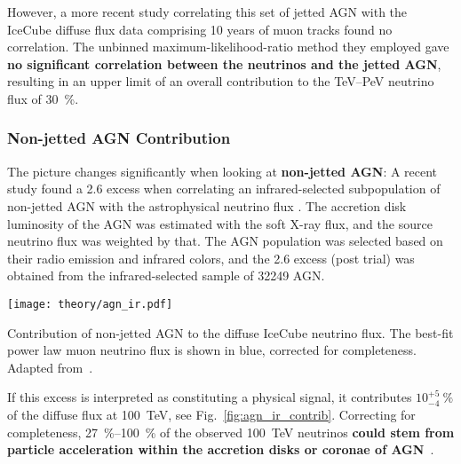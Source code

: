 However, a more recent study correlating this set of jetted AGN with the IceCube diffuse flux data comprising 10 years of muon tracks found no correlation. The unbinned maximum-likelihood-ratio method they employed gave \textbf{no significant correlation between the neutrinos and the jetted AGN}, resulting in an upper limit of an overall contribution to the \unit{\tera\eV}--\unit{\peta\eV} neutrino flux of \SI{30}{\percent}.

\subsubsection{Non-jetted AGN Contribution}

The picture changes significantly when looking at \textbf{non-jetted AGN}: A recent study found a \SI{2.6}{\sigma} excess when correlating an infrared-selected subpopulation of non-jetted AGN with the astrophysical neutrino flux . The accretion disk luminosity of the AGN was estimated with the soft X-ray flux, and the source neutrino flux was weighted by that. The AGN population was selected based on their radio emission and infrared colors, and the \SI{2.6}{\sigma} excess (post trial) was obtained from the infrared-selected sample of 32249 AGN\@.

\begin{marginfigure}
    \texttt{[image: theory/agn\_ir.pdf]}
    \caption[Non-jetted AGN]{Contribution of non-jetted AGN to the diffuse IceCube neutrino flux. The best-fit power law muon neutrino flux is shown in blue, corrected for completeness. Adapted from~\cite{Abbasi2022c}.}
\end{marginfigure}

If this excess is interpreted as constituting a physical signal, it contributes $10^{+5}_{-4} ~\%$ of the diffuse flux at \SI{100}{\tera\eV}, see Fig.~\ref{fig:agn_ir_contrib}. Correcting for completeness, \SIrange{27}{100}{\percent} of the observed \SI{100}{\tera\eV} neutrinos \textbf{could stem from particle acceleration within the accretion disks or coronae of AGN}~\cite{Abbasi2022c}.


